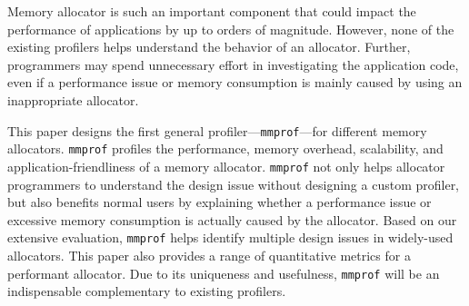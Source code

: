 Memory allocator is such an important component that could impact the performance of applications by up to orders of magnitude. However, none of the existing profilers helps understand the behavior of an allocator. Further, programmers may spend unnecessary effort in investigating the application code, even if a performance issue or memory consumption is mainly caused by using an inappropriate allocator. 

This paper designs the first general profiler---\texttt{mmprof}---for different memory allocators. \texttt{mmprof} profiles the performance, memory overhead, scalability, and application-friendliness of a memory allocator. \texttt{mmprof} not only helps allocator programmers to understand the design issue without designing a custom profiler, but also benefits normal users by explaining whether a performance issue or excessive memory consumption is actually caused by the allocator. Based on our extensive evaluation, \texttt{mmprof} helps identify multiple design issues in widely-used allocators. This paper also provides a range of quantitative metrics for a performant allocator. Due to its uniqueness and usefulness, \texttt{mmprof} will be an indispensable complementary to existing profilers. 

 